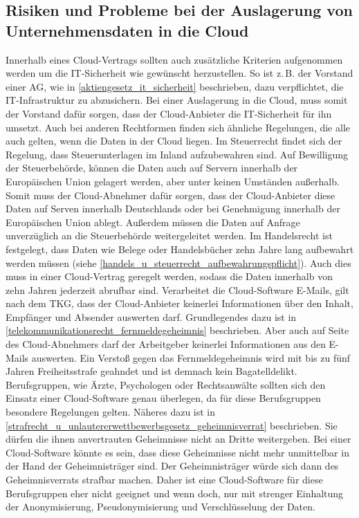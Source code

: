  \subsection{Risiken und Probleme bei der Auslagerung von Unternehmensdaten in die Cloud}
Innerhalb eines {\glqq}Cloud-Vertrags{\grqq} sollten auch zus\"atzliche Kriterien aufgenommen werden um die IT-Sicherheit wie gew\"unscht herzustellen. So ist z.\,B. der Vorstand einer AG, wie in \vref{aktiengesetz_it_sicherheit} beschrieben, dazu verpflichtet, die IT-Infrastruktur zu abzusichern. Bei einer Auslagerung in die Cloud, muss somit der Vorstand daf\"ur sorgen, dass der Cloud-Anbieter die IT-Sicherheit f\"ur ihn umsetzt. Auch bei anderen Rechtformen finden sich \"ahnliche Regelungen, die alle auch gelten, wenn die Daten in der Cloud liegen.\newline 
Im Steuerrecht findet sich der Regelung, dass Steuerunterlagen im Inland aufzubewahren sind. Auf Bewilligung der Steuerbeh\"orde, k\"onnen die Daten auch auf Servern innerhalb der Europ\"aischen Union gelagert werden, aber unter keinen Umst\"anden au{\ss}erhalb. Somit muss der Cloud-Abnehmer daf\"ur sorgen, dass der Cloud-Anbieter diese Daten auf Serven innerhalb Deutschlands oder bei Genehmigung innerhalb der Europ\"aischen Union ablegt. Au{\ss}erdem m\"ussen die Daten auf Anfrage unverz\"uglich an die Steuerbeh\"orde weitergeleitet werden. Im Handelsrecht ist festgelegt, dass Daten wie Belege oder Handelsb\"ucher zehn Jahre lang aufbewahrt werden m\"ussen (siehe \vref{handels_u_steuerrecht_aufbewahrungspflicht}). Auch dies muss in einer {\glqq}Cloud-Vertrag{\grqq} geregelt werden, sodass die Daten innerhalb von zehn Jahren jederzeit abrufbar sind.\newline
Verarbeitet die Cloud-Software E-Mails, gilt nach dem TKG, dass der Cloud-Anbieter keinerlei Informationen \"uber den Inhalt, Empf\"anger und Absender auswerten darf. Grundlegendes dazu ist in \vref{telekommunikationsrecht_fernmeldegeheimnis} beschrieben. Aber auch auf Seite des Cloud-Abnehmers darf der Arbeitgeber keinerlei Informationen aus den E-Mails auswerten. Ein Versto{\ss} gegen das Fernmeldegeheimnis wird mit bis zu f\"unf Jahren Freiheitsstrafe geahndet und ist demnach kein Bagatelldelikt.\newline 
Berufsgruppen, wie \"Arzte, Psychologen oder Rechtsanw\"alte sollten sich den Einsatz einer Cloud-Software genau \"uberlegen, da f\"ur diese Berufsgruppen besondere Regelungen gelten. N\"aheres dazu ist in \vref{strafrecht_u_unlautererwettbewerbsgesetz_geheimnisverrat} beschrieben. Sie d\"urfen die ihnen anvertrauten Geheimnisse nicht an Dritte weitergeben. Bei einer Cloud-Software k\"onnte es sein, dass diese Geheimnisse nicht mehr unmittelbar in der Hand der Geheimnistr\"ager sind. Der Geheimnistr\"ager w\"urde sich dann des Geheimnisverrats strafbar machen. Daher ist eine Cloud-Software f\"ur diese Berufsgruppen eher nicht geeignet und wenn doch, nur mit strenger Einhaltung der Anonymisierung, Pseudonymisierung und Verschl\"usselung der Daten.\newline
